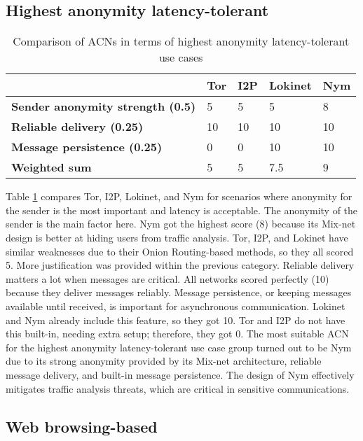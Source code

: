\subsection{Highest anonymity latency-tolerant}

\begin{table}[!ht]
\caption{Comparison of ACNs in terms of highest anonymity latency-tolerant use cases}
\label{tab:high_latency_uc}
\small
\begin{tabular}{|p{}|p{}|p{}|p{}|p{}|}
\hline
\textbf{} & \textbf{Tor} & \textbf{I2P} & \textbf{Lokinet} & \textbf{Nym} \\
\hline
\textbf{Sender anonymity strength (0.5)} & 5 & 5 & 5 & 8 \\
\hline
\textbf{Reliable delivery (0.25)} & 10 & 10 & 10 & 10 \\
\hline
\textbf{Message persistence (0.25)} & 0 & 0 & 10 & 10 \\
\hline
\textbf{Weighted sum} & 5 & 5 & 7.5 & 9 \\
\hline
\end{tabular}
\end{table}

Table \ref{tab:high_latency_uc} compares Tor, I2P, Lokinet, and Nym for scenarios where anonymity for the sender is the most important and latency is acceptable.
The anonymity of the sender is the main factor here. Nym got the highest score (8) because its Mix-net design is better at hiding users from traffic analysis. Tor, I2P, and Lokinet have similar weaknesses due to their Onion Routing-based methods, so they all scored 5. More justification was provided within the previous category.
Reliable delivery matters a lot when messages are critical. All networks scored perfectly (10) because they deliver messages reliably.
Message persistence, or keeping messages available until received, is important for asynchronous communication. Lokinet and Nym already include this feature, so they got 10. Tor and I2P do not have this built-in, needing extra setup; therefore, they got 0.
The most suitable ACN for the highest anonymity latency-tolerant use case group turned out to be Nym due to its strong anonymity provided by its Mix-net architecture, reliable message delivery, and built-in message persistence. The design of Nym effectively mitigates traffic analysis threats, which are critical in sensitive communications.

\subsection{Web browsing-based}

